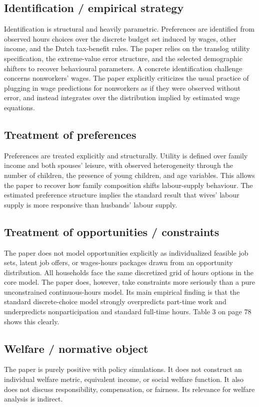 \documentclass[11pt,a4paper]{article}
\begin{document}
\subsection*{Identification / empirical strategy}
Identification is structural and heavily parametric. Preferences are identified from observed hours choices over the discrete budget set induced by wages, other income, and the Dutch tax-benefit rules. The paper relies on the translog utility specification, the extreme-value error structure, and the selected demographic shifters to recover behavioural parameters. A concrete identification challenge concerns nonworkers’ wages. The paper explicitly criticizes the usual practice of plugging in wage predictions for nonworkers as if they were observed without error, and instead integrates over the distribution implied by estimated wage equations.

\subsection*{Treatment of preferences}
Preferences are treated explicitly and structurally. Utility is defined over family income and both spouses’ leisure, with observed heterogeneity through the number of children, the presence of young children, and age variables. This allows the paper to recover how family composition shifts labour-supply behaviour. The estimated preference structure implies the standard result that wives’ labour supply is more responsive than husbands’ labour supply.

\subsection*{Treatment of opportunities / constraints}
The paper does not model opportunities explicitly as individualized feasible job sets, latent job offers, or wages-hours packages drawn from an opportunity distribution. All households face the same discretized grid of hours options in the core model. The paper does, however, take constraints more seriously than a pure unconstrained continuous-hours model. Its main empirical finding is that the standard discrete-choice model strongly overpredicts part-time work and underpredicts nonparticipation and standard full-time hours. Table 3 on page 78 shows this clearly.

\subsection*{Welfare / normative object}
The paper is purely positive with policy simulations. It does not construct an individual welfare metric, equivalent income, or social welfare function. It also does not discuss responsibility, compensation, or fairness. Its relevance for welfare analysis is indirect.
\end{document}
